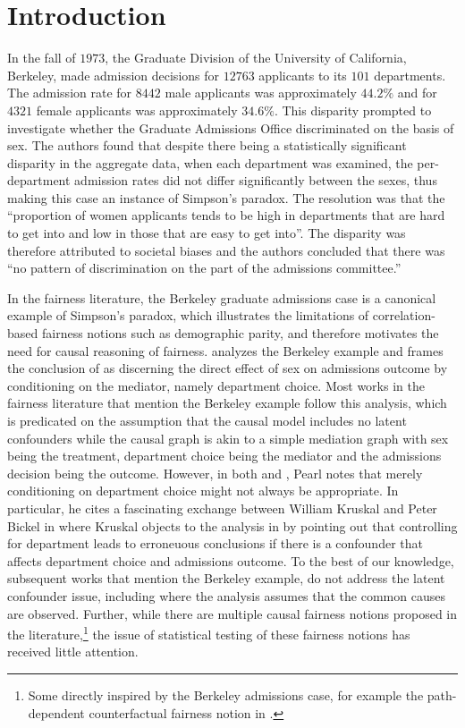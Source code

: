 \section{Introduction}\label{sec:intro}
In the fall of $1973$, the Graduate Division of the University of California, Berkeley, made admission decisions for $12763$ applicants to its $101$ departments. The admission rate for $8442$ male applicants was approximately $44.2\%$ and for $4321$ female applicants was approximately $34.6 \%$. This disparity prompted \citet{BickelHO75} to investigate whether the Graduate Admissions Office discriminated on the basis of sex. The authors found that despite there being a statistically significant disparity in the aggregate data, when each department was examined, the per-department admission rates did not differ significantly between the sexes, thus making this case an instance of Simpson's paradox. The resolution was that the ``proportion of women applicants tends to be high in departments that are hard to get into and low in those that are easy to get into''. The disparity was therefore attributed to societal biases and the authors concluded that there was ``no pattern of discrimination on the part of the admissions committee.''  

In the fairness literature, the Berkeley graduate admissions case is a canonical example of Simpson's paradox, which illustrates the limitations of correlation-based fairness notions such as demographic parity, and therefore motivates the need for causal reasoning of fairness. \citet[Section 4.5.4]{Pearl09} analyzes the Berkeley example and frames the conclusion of \citet{BickelHO75} as discerning the direct effect of sex on admissions outcome by conditioning on the mediator, namely department choice. Most works in the fairness literature that mention the Berkeley example follow this analysis, which is predicated on the assumption that the causal model includes no latent confounders while the causal graph is akin to a simple mediation graph with sex being the treatment, department choice being the mediator and the admissions decision being the outcome. However, in both \citet{Pearl09} and \citet{PearlMackenzie18}, Pearl notes that merely conditioning on department choice might not always be appropriate. In particular, he cites a fascinating exchange between William Kruskal and Peter Bickel in \cite{FairleyMosteller77} where Kruskal objects to the analysis in \cite{BickelHO75} by pointing out that controlling for department leads to erroneuous conclusions if there is a confounder that affects department choice and admissions outcome. To the best of our knowledge, subsequent works that mention the Berkeley example, do not address the latent confounder issue, including \citet{Pearl09} where the analysis assumes that the common causes are observed. Further, while there are multiple causal fairness notions proposed in the literature,\footnote{Some directly inspired by the Berkeley admissions case, for example the path-dependent counterfactual fairness notion in \citet[Appendix S4]{KusnerLRS17}.} the issue of statistical testing of these fairness notions has received little attention. 

